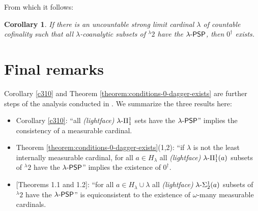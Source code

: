 \documentclass{amsart}
\numberwithin{equation}{section}
\def\hyp{{\hbox{-}}}
\newtheorem{theorem}{Theorem}[section]
\newtheorem{corollary}[theorem]{Corollary}
\theoremstyle{definition}
\theoremstyle{remark}
\begin{document}
From which it follows: 

\begin{corollary}\label{theorem:main-theorem}
	If there is an uncountable strong limit cardinal $\lambda$ of countable cofinality such that all $\lambda$-coanalytic subsets of ${}^{\lambda}2$ have the $\lambda\hyp\mathsf{PSP}$, then $0^{\dagger}$ exists.
\end{corollary}

\section{Final remarks}\label{section:final-remarks}

Corollary \ref{c310} and Theorem \ref{theorem:conditions-0-dagger-exists} are further steps of the analysis conducted in \cite{lucke2023definability}. We summarize the three results here:
\begin{itemize}
    \item Corollary \ref{c310}: ``all \emph{(lightface)} $\lambda\hyp\Pi^1_1$ sets have the $\lambda\hyp\mathsf{PSP}$'' implies the consistency of a measurable cardinal.
    \item Theorem \ref{theorem:conditions-0-dagger-exists}(1,2): ``if $\lambda$ is not the least internally measurable cardinal, for all $a\in H_\lambda$ all \emph{(lightface)} $\lambda\hyp\Pi^1_1(a)$  subsets of ${}^{\lambda}2$ have the $\lambda\hyp\mathsf{PSP}$'' implies the existence of  $0^{\dagger}$.
    \item \cite{lucke2023definability}[Theorems 1.1 and 1.2]: ``for all $a\in H_\lambda\cup\lambda$ all \emph{(lightface)} $\lambda\hyp\Sigma^1_2(a)$  subsets of ${}^{\lambda}2$ have the $\lambda\hyp\mathsf{PSP}$''  is equiconsistent to the existence of $\omega$-many measurable cardinals.
\end{itemize}
\end{document}
